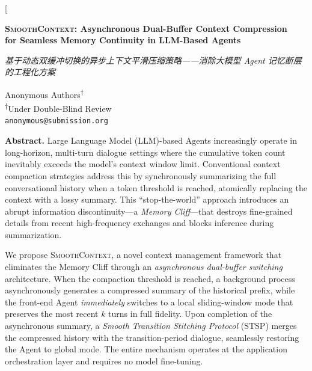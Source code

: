 \documentclass[10pt,twocolumn]{article}
\newcommand{\sys}{\textsc{SmoothContext}}
\begin{document}
\twocolumn[
\begin{center}
  {\LARGE\bfseries \sys{}: Asynchronous Dual-Buffer Context Compression \\[4pt]
   for Seamless Memory Continuity in LLM-Based Agents}

  \vspace{0.4em}
  {\small\textit{基于动态双缓冲切换的异步上下文平滑压缩策略——消除大模型 Agent 记忆断层的工程化方案}}

  \vspace{1.2em}

  {\large
    Anonymous Authors\textsuperscript{$\dagger$} \\[4pt]
    \textsuperscript{$\dagger$}Under Double-Blind Review \\[2pt]
    {\normalsize\texttt{anonymous@submission.org}}
  }

  \vspace{1.5em}

  \parbox{0.92\textwidth}{\small\textbf{Abstract.}
    Large Language Model (LLM)-based Agents increasingly operate in long-horizon,
    multi-turn dialogue settings where the cumulative token count inevitably exceeds
    the model's context window limit. Conventional context compaction strategies address
    this by synchronously summarizing the full conversational history when a token threshold
    is reached, atomically replacing the context with a lossy summary. This ``stop-the-world''
    approach introduces an abrupt information discontinuity---a \emph{Memory Cliff}---that
    destroys fine-grained details from recent high-frequency exchanges and blocks inference
    during summarization.

    We propose \sys{}, a novel context management framework that eliminates the Memory
    Cliff through an \emph{asynchronous dual-buffer switching} architecture. When the
    compaction threshold is reached, a background process asynchronously generates a
    compressed summary of the historical prefix, while the front-end Agent \emph{immediately}
    switches to a local sliding-window mode that preserves the most recent $k$ turns in
    full fidelity. Upon completion of the asynchronous summary, a \emph{Smooth Transition
    Stitching Protocol} (STSP) merges the compressed history with the transition-period
    dialogue, seamlessly restoring the Agent to global mode. The entire mechanism operates
    at the application orchestration layer and requires no model fine-tuning.

}
\end{center}
\end{document}
